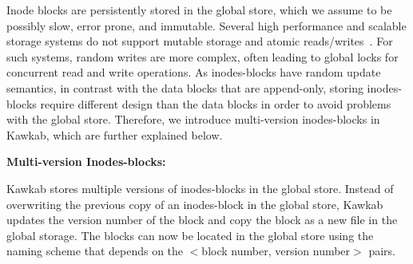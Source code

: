 \documentclass[]{article}
\newcommand{\subtopic}[1]{\vspace{1.5pt} \noindent \textbf{#1}}
\begin{document}


Inode blocks are persistently stored in the global store, which we assume to be
possibly slow, error prone, and immutable. 
Several high performance and
scalable storage systems do not support mutable storage and atomic reads/writes~\cite{}. 
For such systems, random writes are more complex, often leading to
global locks for concurrent read and write operations. As inodes-blocks have
random update semantics, in contrast with the data blocks that are append-only,
storing inodes-blocks require different design than the data blocks
in order to avoid problems with the global store. Therefore, we introduce
multi-version inodes-blocks in Kawkab, which are further explained below.



\subtopic{Multi-version Inodes-blocks:} 


Kawkab stores multiple versions of inodes-blocks in the global store.  Instead
of overwriting the previous copy of an inodes-block in the global store, Kawkab
updates the version number of the block and copy the block as a new file in the
global storage. The blocks can now be located in the global store using the naming
scheme that depends on the $<$block number,  version number$>$ pairs.
\end{document}
